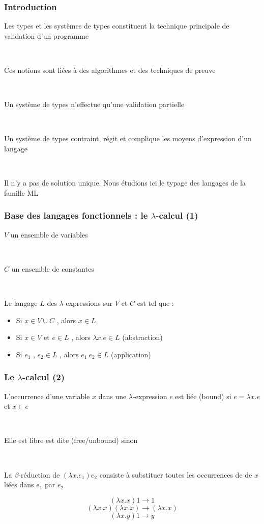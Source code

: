 \documentclass[handout,t]{beamer}
\begin{document}
\begin{frame}
\frametitle{Introduction}

Les types et les systèmes de types constituent la technique
principale de validation d'un programme

~

Ces notions sont liées à des algorithmes et des techniques de
preuve

~

Un système de types n'effectue qu'une validation partielle

~

Un système de types contraint, régit et complique les moyens
d'expression d'un langage

~

Il n'y a pas de solution unique. Nous étudions ici le typage des
langages de la famille ML


\end{frame}

\begin{frame}

\frametitle{Base des langages fonctionnels : le $\lambda$-calcul (1)}

$V$ un ensemble de variables

~

$C$ un ensemble de constantes

~

Le langage $L$ des $\lambda$-expressions sur $V$ et $C$ est tel que :

\begin{itemize}
\item Si $x \in V \cup C$ , alors $x \in L$ 
\item Si $x \in V$ et $e \in L$ , alors $\lambda x . e \in L$ (abstraction)
\item Si $e_1$ , $e_2 \in L$ , alors $e_1\ e_2 \in L$ (application)
\end{itemize}


\end{frame}

\begin{frame}

\frametitle{Le $\lambda$-calcul (2)}

L'occurrence d'une variable 
$x$ dans une $\lambda$-expression $e$
est
liée (bound) si $e = \lambda x . e$ et $x \in e$

~

Elle est libre
est dite
(free/unbound) sinon

~

La
$\beta$-réduction de $(\lambda x . e_1 ) e_2$
consiste à substituer toutes les
occurrences de
de
$x$ liées dans $e_1$ par $e_2$ 

$$(\lambda x . x ) 1 \rightarrow 1$$
$$(\lambda x . x ) (\lambda x . x ) \rightarrow (\lambda x . x )$$
$$(\lambda x . y ) 1 \rightarrow y$$

\end{frame}
\end{document}
